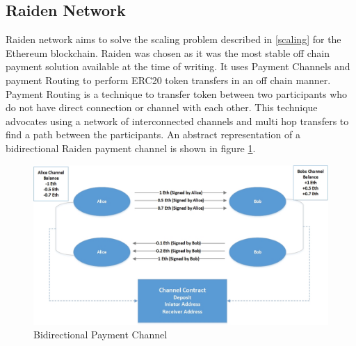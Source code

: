 \subsection{Raiden Network} \label{raiden} 
Raiden network aims to solve the scaling problem described in \ref{scaling} for the Ethereum blockchain. Raiden was chosen as it was the most stable off chain payment solution available at the time of writing. It uses Payment Channels and payment Routing to perform ERC20 token transfers in an off chain manner.  Payment Routing is a technique to transfer token between two participants who do not have direct connection or channel with each other. This technique advocates using a network of interconnected channels and multi hop transfers to find a path between the participants. An abstract representation of a bidirectional Raiden payment channel is shown in figure \ref{fig:RPC}. 

\begin{figure}[h]
	\centering
    \includegraphics[width=140mm,scale=1]{figs/RPC}
	\caption{Bidirectional Payment Channel}
	\label{fig:RPC}
\end{figure}

